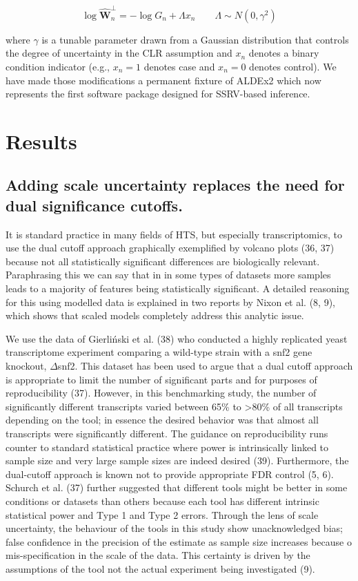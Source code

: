 \documentclass[
]{article}
\begin{document}
\[\log \mathbf{\hat{W}}^{\perp}_{n} = -\log G_{n} + \Lambda x_{n} \qquad \Lambda \sim N(0, \gamma^{2})\]

where \(\gamma\) is a tunable parameter drawn from a Gaussian
distribution that controls the degree of uncertainty in the CLR
assumption and \(x_{n}\) denotes a binary condition indicator (e.g.,
\(x_{n}=1\) denotes case and \(x_{n}=0\) denotes control). We have made
those modifications a permanent fixture of ALDEx2 which now represents
the first software package designed for SSRV-based inference.

\section{Results}\label{results}

\subsection{Adding scale uncertainty replaces the need for dual
significance
cutoffs.}\label{adding-scale-uncertainty-replaces-the-need-for-dual-significance-cutoffs.}

It is standard practice in many fields of HTS, but especially
transcriptomics, to use the dual cutoff approach graphically exemplified
by volcano plots (36, 37) because not all statistically significant
differences are biologically relevant. Paraphrasing this we can say that
in in some types of datasets more samples leads to a majority of
features being statistically significant. A detailed reasoning for this
using modelled data is explained in two reports by Nixon et al. (8, 9),
which shows that scaled models completely address this analytic issue.

We use the data of Gierliński et al. (38) who conducted a highly
replicated yeast transcriptome experiment comparing a wild-type strain
with a snf2 gene knockout, \(\Delta\)snf2. This dataset has been used to
argue that a dual cutoff approach is appropriate to limit the number of
significant parts and for purposes of reproducibility (37). However, in
this benchmarking study, the number of significantly different
transcripts varied between 65\% to \textgreater80\% of all transcripts
depending on the tool; in essence the desired behavior was that almost
all transcripts were significantly different. The guidance on
reproducibility runs counter to standard statistical practice where
power is intrinsically linked to sample size and very large sample sizes
are indeed desired (39). Furthermore, the dual-cutoff approach is known
not to provide appropriate FDR control (5, 6). Schurch et al. (37)
further suggested that different tools might be better in some
conditions or datasets than others because each tool has different
intrinsic statistical power and Type 1 and Type 2 errors. Through the
lens of scale uncertainty, the behaviour of the tools in this study show
unacknowledged bias; false confidence in the precision of the estimate
as sample size increases because o mis-specification in the scale of the
data. This certainty is driven by the assumptions of the tool not the
actual experiment being investigated (9).
\end{document}
